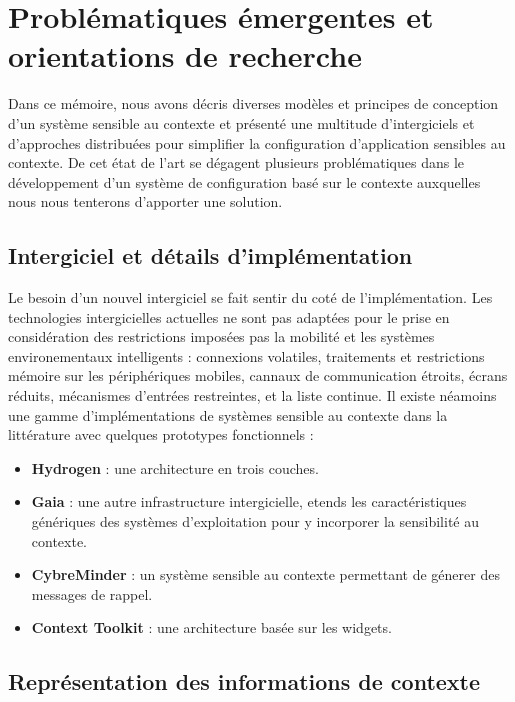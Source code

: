 \chapter{Problématiques émergentes et orientations de recherche}

Dans ce mémoire, nous avons décris diverses modèles et principes de conception
d'un système sensible au contexte et présenté une multitude d'intergiciels et
d'approches distribuées pour simplifier la configuration d'application sensibles
au contexte. De cet état de l'art se dégagent plusieurs problématiques dans le
développement d'un système de configuration basé sur le contexte auxquelles nous
nous tenterons d'apporter une solution.

\section{Intergiciel et détails d'implémentation}

Le besoin d'un nouvel intergiciel se fait sentir du coté de l'implémentation.
Les technologies intergicielles actuelles ne sont pas adaptées pour le prise en
considération des restrictions imposées pas la mobilité et les systèmes
environementaux intelligents : connexions volatiles, traitements et restrictions
mémoire sur les périphériques mobiles, cannaux de communication étroits, écrans
réduits, mécanismes d'entrées restreintes, et la liste continue. Il existe
néamoins une gamme d'implémentations de systèmes sensible au contexte dans la
littérature avec quelques prototypes fonctionnels :

\begin{itemize}
    \item \textbf{Hydrogen} \cite{hofer_context-awareness_2003}: 
	    une architecture en trois couches.
    \item \textbf{Gaia} \cite{chetan_mobile_2005}: 
            une autre infrastructure intergicielle, etends les caractéristiques
	    génériques des systèmes d'exploitation pour y incorporer la
	    sensibilité au contexte.
    \item \textbf{CybreMinder} \cite{abowd_context-aware_2002}: 
	    un système sensible au contexte permettant de génerer des messages
	    de rappel.
    \item \textbf{Context Toolkit} \cite{dey_conceptual_2001}: 
	    une architecture basée sur les widgets.
\end{itemize}


\section{Représentation des informations de contexte}

